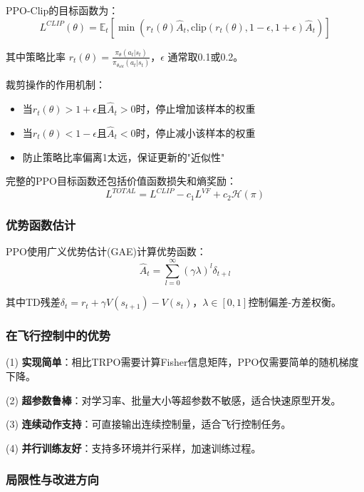 \documentclass[12pt,a4paper]{ctexart}
\begin{document}
PPO-Clip的目标函数为：
\begin{equation}
L^{CLIP}(\theta) = \mathbb{E}_t\left[\min\left(r_t(\theta)\hat{A}_t, \text{clip}(r_t(\theta), 1-\epsilon, 1+\epsilon)\hat{A}_t\right)\right]
\end{equation}

其中策略比率 $r_t(\theta) = \frac{\pi_\theta(a_t|s_t)}{\pi_{\theta_{old}}(a_t|s_t)}$，$\epsilon$ 通常取0.1或0.2。

裁剪操作的作用机制：
\begin{itemize}
    \item 当$r_t(\theta) > 1+\epsilon$且$\hat{A}_t > 0$时，停止增加该样本的权重
    \item 当$r_t(\theta) < 1-\epsilon$且$\hat{A}_t < 0$时，停止减小该样本的权重
    \item 防止策略比率偏离1太远，保证更新的"近似性"
\end{itemize}

完整的PPO目标函数还包括价值函数损失和熵奖励：
\begin{equation}
L^{TOTAL} = L^{CLIP} - c_1 L^{VF} + c_2 \mathcal{H}(\pi)
\end{equation}

\subsubsection{优势函数估计}

PPO使用广义优势估计(GAE)计算优势函数：
\begin{equation}
\hat{A}_t = \sum_{l=0}^{\infty} (\gamma\lambda)^l \delta_{t+l}
\end{equation}

其中TD残差$\delta_t = r_t + \gamma V(s_{t+1}) - V(s_t)$，$\lambda \in [0,1]$控制偏差-方差权衡。

\subsubsection{在飞行控制中的优势}

(1) \textbf{实现简单}：相比TRPO需要计算Fisher信息矩阵，PPO仅需要简单的随机梯度下降。

(2) \textbf{超参数鲁棒}：对学习率、批量大小等超参数不敏感，适合快速原型开发。

(3) \textbf{连续动作支持}：可直接输出连续控制量，适合飞行控制任务。

(4) \textbf{并行训练友好}：支持多环境并行采样，加速训练过程。

\subsubsection{局限性与改进方向}
\end{document}
